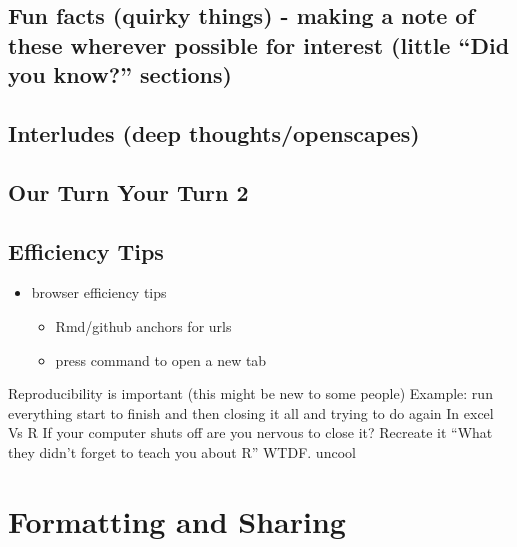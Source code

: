\documentclass[]{book}
\providecommand{\tightlist}{%
  \setlength{\itemsep}{0pt}\setlength{\parskip}{0pt}}
\begin{document}
\hypertarget{fun-facts-quirky-things---making-a-note-of-these-wherever-possible-for-interest-little-did-you-know-sections-4}{%
\section{Fun facts (quirky things) - making a note of these wherever possible for interest (little ``Did you know?'' sections)}\label{fun-facts-quirky-things---making-a-note-of-these-wherever-possible-for-interest-little-did-you-know-sections-4}}

\hypertarget{interludes-deep-thoughtsopenscapes-5}{%
\section{Interludes (deep thoughts/openscapes)}\label{interludes-deep-thoughtsopenscapes-5}}

\hypertarget{our-turn-your-turn-2-5}{%
\section{Our Turn Your Turn 2}\label{our-turn-your-turn-2-5}}

\hypertarget{efficiency-tips-5}{%
\section{Efficiency Tips}\label{efficiency-tips-5}}

\begin{itemize}
\tightlist
\item
  browser efficiency tips

  \begin{itemize}
  \tightlist
  \item
    Rmd/github anchors for urls
  \item
    press command to open a new tab
  \end{itemize}
\end{itemize}

Reproducibility is important (this might be new to some people)
Example: run everything start to finish and then closing it all and trying to do again
In excel
Vs R
If your computer shuts off are you nervous to close it?
Recreate it
``What they didn't forget to teach you about R'' WTDF. uncool

\hypertarget{format}{%
\chapter{Formatting and Sharing}\label{format}}
\end{document}
